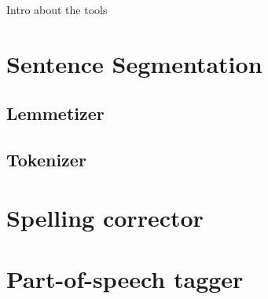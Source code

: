 Intro about the tools


\section{Sentence Segmentation}
\subsection{Lemmetizer}
\subsection{Tokenizer}
\section{Spelling corrector}
\section{Part-of-speech tagger}